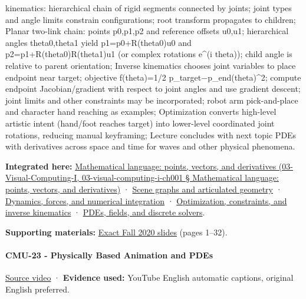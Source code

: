 kinematics: hierarchical chain of rigid segments connected by joints; joint types and angle limits constrain configurations; root transform propagates to children; Planar two-link chain: points p0,p1,p2 and reference offsets u0,u1; hierarchical angles theta0,theta1 yield p1=p0+R(theta0)u0 and p2=p1+R(theta0)R(theta1)u1 (or complex rotations e\^{}(i theta)); child angle is relative to parent orientation; Inverse kinematics chooses joint variables to place endpoint near target; objective f(theta)=1/2 \textbar\textbar p\_target−p\_end(theta)\textbar\textbar\^{}2; compute endpoint Jacobian/gradient with respect to joint angles and use gradient descent; joint limits and other constraints may be incorporated; robot arm pick-and-place and character hand reaching as examples; Optimization converts high-level artistic intent (hand/foot reaches target) into lower-level coordinated joint rotations, reducing manual keyframing; Lecture concludes with next topic PDEs with derivatives across space and time for waves and other physical phenomena.

\textbf{Integrated here:} \href{}{Mathematical language: points, vectors, and derivatives (03-Visual-Computing-I, 03-visual-computing-i-ch001 § Mathematical language: points, vectors, and derivatives)} · \hyperref[04-visual-computing-ii-ch029]{Scene graphs and articulated geometry} · \hyperref[04-visual-computing-ii-ch029]{Dynamics, forces, and numerical integration} · \hyperref[04-visual-computing-ii-ch029]{Optimization, constraints, and inverse kinematics} · \hyperref[04-visual-computing-ii-ch030]{PDEs, fields, and discrete solvers}.

\textbf{Supporting materials:} \href{https://15462.courses.cs.cmu.edu/fall2020content/lectures/22_optimization/22_optimization_slides.pdf}{Exact Fall 2020 slides} (pages 1--32).

\paragraph{CMU-23 - Physically Based Animation and PDEs}\label{cmu-23---physically-based-animation-and-pdes}

\href{https://www.youtube.com/watch?v=gqdXsw_Q_as}{Source video} · \textbf{Evidence used:} YouTube English automatic captions, original English preferred.

